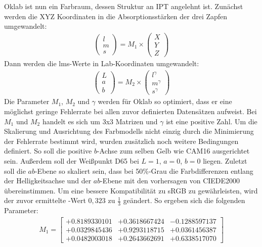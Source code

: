 \documentclass[12pt, a4paper, ngerman]{article}
\begin{document}
Oklab ist nun ein Farbraum, dessen Struktur an IPT angelehnt ist.
Zunächst werden die XYZ Koordinaten in die Absorptionsstärken der drei Zapfen umgewandelt:
\begin{equation}
  \begin{aligned}
    \begin{pmatrix} l \\ m \\ s \end{pmatrix} = M_1 \times \begin{pmatrix} X \\ Y \\ Z \end{pmatrix}
  \end{aligned}
\end{equation}
Dann werden die lms-Werte in Lab-Koordinaten umgewandelt:
\begin{equation}
  \begin{aligned}
    \begin{pmatrix} L \\ a \\ b \end{pmatrix} = M_2 \times \begin{pmatrix} l^{ \gamma } \\ m^{ \gamma } \\ s^{ \gamma } \end{pmatrix}
  \end{aligned}
\end{equation}
Die Parameter \(M_1\), \(M_2\) und \(\gamma\) werden für Oklab so optimiert, 
dass er eine möglichst geringe Fehlerrate bei allen zuvor definierten Datensätzen aufweist. 
Bei \(M_1\) und \(M_2\) handelt es sich um 3x3 Matrizen und \(\gamma\) ist eine positive Zahl. 
Um die Skalierung und Ausrichtung des Farbmodells nicht einzig durch die Minimierung der Fehlerrate bestimmt wird, wurden zusätzlich noch weitere Bedingungen definiert.
So soll die positive \(b\)-Achse zum selben Gelb wie CAM16 ausgerichtet sein. 
Außerdem soll der Weißpunkt D65 bei \(L=1\), \(a=0\), \(b=0\) liegen. 
Zuletzt soll die \(ab\)-Ebene so skaliert sein, dass bei 50\%-Grau die Farbdifferenzen entlang der Helligkeitsachse und 
der \(ab\)-Ebene mit den vorhersagen von CIEDE2000 übereinstimmen. 
Um eine bessere Kompatibilität zu sRGB zu gewährleisten, wird der zuvor ermittelte \gamma-Wert \(0,323\) zu \(\frac{ 1 }{ 3 }\) geändert. 
So ergeben sich die folgenden Parameter:  
\begin{equation}
  \begin{aligned}
    M_1 = \begin{bmatrix} +0.8189330101 & +0.3618667424 & -0.1288597137 \\ +0.0329845436 & +0.9293118715 & +0.0361456387 \\ +0.0482003018 & +0.2643662691 & +0.6338517070 \end{bmatrix}  
  \end{aligned}
\end{equation}
\end{document}
